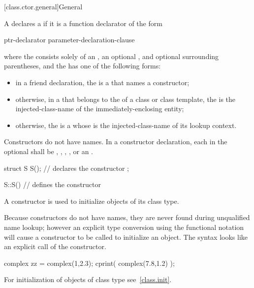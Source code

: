 [class.ctor.general]{General}%
%
%

\pnum
A  declares a  if it is a
function declarator of the form
\begin{ncbnf}
ptr-declarator \terminal{(} parameter-declaration-clause \terminal{)}  
\end{ncbnf}
where the  consists solely of an
, an optional ,
and optional surrounding parentheses, and the  has
one of the following forms:
\begin{itemize}
\item
in a friend declaration,
the  is a 
that names a constructor;
\item
otherwise, in a  that belongs to the
 of a class or class template,
the  is the
injected-class-name of the immediately-enclosing entity;

\item
otherwise, the
 is a 
whose  is
the injected-class-name of its lookup context.
\end{itemize}
Constructors do not have names.
In a constructor declaration, each  in the optional
 shall be
,
,
,
, or
an .
\begin{example}
\begin{codeblock}
struct S {
  S();              // declares the constructor
};

S::S() { }          // defines the constructor
\end{codeblock}
\end{example}

\pnum
{}%
A constructor is used to initialize objects of its class type.
\begin{note}
Because constructors do not have names, they are never found during
unqualified name lookup; however an explicit type conversion using the functional
notation will cause a constructor to be called to
initialize an object.
The syntax looks like an explicit call of the constructor.
\end{note}
\begin{example}
\begin{codeblock}
complex zz = complex(1,2.3);
cprint( complex(7.8,1.2) );
\end{codeblock}
\end{example}
\begin{note}
For initialization of objects of class type see~\ref{class.init}.
\end{note}

